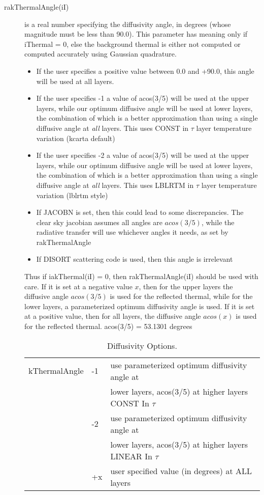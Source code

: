 \documentclass[12pt]{article}
\newlength{\colwidth}
\begin{document}
{\begin{description}
\item[{\sf rakThermalAngle(iI)}] is a real number specifying the diffusivity
angle, in degrees (whose magnitude must be less than 90.0).  This
parameter has meaning only if {\sf iThermal = 0}, else the
background thermal is either not computed or computed accurately
using Gaussian quadrature.
\begin{itemize}
\item If the user specifies a positive value between 0.0 and +90.0,
  this angle will be used at all layers.
\item If the user specifies -1  a value of acos(3/5)
  will be used at the upper layers, while our optimum diffusive angle
  will be used at lower layers, the combination of which is a better
  approximation than using a single diffusive angle at {\em all} layers.
  This uses CONST in $\tau$ layer temperature variation (kcarta default)
\item If the user specifies -2  a value of acos(3/5)
  will be used at the upper layers, while our optimum diffusive angle
  will be used at lower layers, the combination of which is a better
  approximation than using a single diffusive angle at {\em all} layers.
  This uses LBLRTM in $\tau$ layer temperature variation (lblrtm style)
\item If JACOBN is set, then this could lead to some discrepancies. The clear
sky jacobian assumes all angles are $acos(3/5)$, while the radiative transfer 
will use whichever angles it needs, as set by rakThermalAngle
\item If DISORT scattering code is used, then this angle is irrelevant
\end{itemize}

Thus if {\sf iakThermal(iI) = 0}, then {\sf rakThermalAngle(iI)} should be used
with care.  If it is set at a negative value $x$, then for the upper
layers the diffusive angle $acos(3/5)$ is used for the reflected
thermal, while for the lower layers, a parameterized optimum
diffusivity angle is used.  If it is set at a positive value, then for
all layers, the diffusive angle $acos(x)$ is used for the
reflected thermal. acos(3/5) = 53.1301 degrees

\begin{small}
\begin{longtable}{|l|lp{\colwidth}|}
\caption{Diffusivity Options.}\\
\hline
kThermalAngle & -1  & use parameterized optimum diffusivity angle at \\
              &     & lower layers, acos(3/5) at higher layers CONST In $\tau$\\
              & -2  & use parameterized optimum diffusivity angle at \\
              &     & lower layers, acos(3/5) at higher layers LINEAR In $\tau$\\
              & +x  & user specified value (in degrees) at ALL layers\\
\hline
\end{longtable}
\end{small}


\end{description}}
\end{document}
